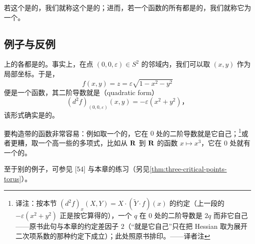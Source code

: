 若这个\trBilinearForm{}是\trNondegenerate{}的，我们就称这个\trCriticalPoint{}是\trNondegenerate{}的；进而，若一个函数的所有\trCriticalPoint{}都是\trNondegenerate{}的，我们就称它为一个\trMorseFunction。

\subsection{例子与反例}
\label{subsec:examples-and-counterexamples}

\trSphere{}上\trHeightFunction{}的各\trCriticalPoint{}都是\trNondegenerate{}的。事实上，在点 $(0,0,\varepsilon)\in S^2$ 的邻域内，我们可以取 $(x,y)$ 作为局部坐标。于是，
\[
f(x,y)=z=\varepsilon\sqrt{1-x^2-y^2}
\]
便是一个函数，其二阶导数就是\textbf{\trQuadraticForm}（quadratic form）
\[
(d^2f)_{(0,0,\varepsilon)}(x,y)=-\varepsilon(x^2+y^2)\text{，}
\]
该形式确实是\trNondegenerate{}的。

要构造带\trDegenerate\trCriticalPoint{}的函数非常容易：例如取一个\trDegenerate{}的\trQuadraticForm，它在 $0$ 处的二阶导数就是它自己；\footnote{译注：按本节 $(d^{2}f)_x(X,Y)=X\cdot(\widetilde{Y}\cdot f)(x)$ 的约定（上一段的 $-\varepsilon(x^{2}+y^{2})$ 正是按它算得的），一个\trQuadraticForm{} $q$ 在 $0$ 处的二阶导数是 $2q$ 而非它自己——原书此句与本章的约定差因子 $2$（“就是它自己”只在把 Hessian 取为\trTaylor{}展开二次项系数的那种约定下成立）；此处照原书排印。——译者注}或者更糟，取一个\trDegree{}高一些的多项式，比如从 $\mathbf{R}$ 到 $\mathbf{R}$ 的函数 $x\mapsto x^3$，它在 $0$ 处就有一个\trDegenerate{}的\trCriticalPoint。

至于别的例子，可参见 [54] 与本章的练习（另见\cref{thm:three-critical-points-torus}）。
